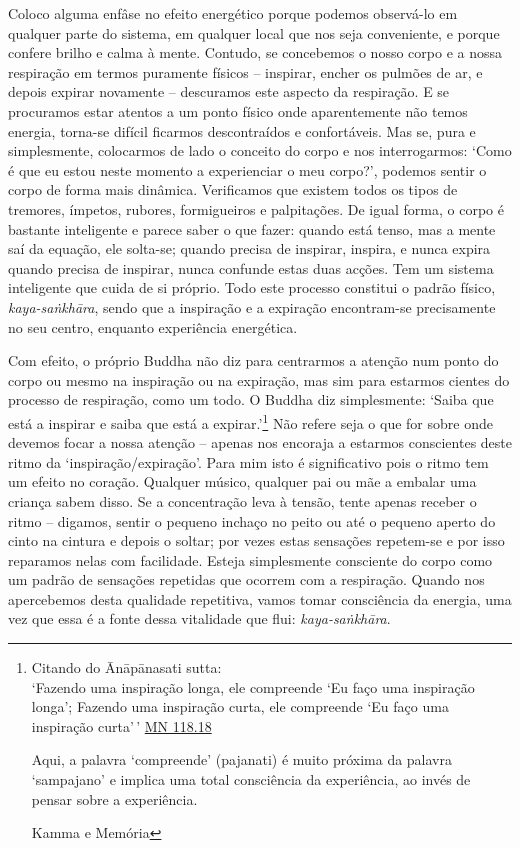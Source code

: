 Coloco alguma enfâse no efeito energético porque podemos observá-lo em qualquer parte do sistema, em qualquer local que nos seja conveniente, e porque confere brilho e calma à mente. Contudo, se concebemos o nosso corpo e a nossa respiração em termos puramente físicos -- inspirar, encher os pulmões de ar, e depois expirar novamente -- descuramos este aspecto da respiração. E se procuramos estar atentos a um ponto físico onde aparentemente não temos energia, torna-se difícil ficarmos descontraídos e confortáveis. Mas se, pura e simplesmente, colocarmos de lado o conceito do corpo e nos interrogarmos: `Como é que eu estou neste momento a experienciar o meu corpo?', podemos sentir o corpo de forma mais dinâmica. Verificamos que existem todos os tipos de tremores, ímpetos, rubores, formigueiros e palpitações. De igual forma, o corpo é bastante inteligente e parece saber o que fazer: quando está tenso, mas a mente saí da equação, ele solta-se; quando precisa de inspirar, inspira, e nunca expira quando precisa de inspirar, nunca confunde estas duas acções. Tem um sistema inteligente que cuida de si próprio. Todo este processo constitui o padrão físico, \emph{kaya-saṅkhāra}, sendo que a inspiração e a expiração encontram-se precisamente no seu centro, enquanto experiência energética.

Com efeito, o próprio Buddha não diz para centrarmos a atenção num ponto do corpo ou mesmo na inspiração ou na expiração, mas sim para estarmos cientes do processo de respiração, como um todo. O Buddha diz simplesmente: `Saiba que está a inspirar e saiba que está a expirar.'\footnote{Citando do Ānāpānasati sutta:\\
  `Fazendo uma inspiração longa, ele compreende `Eu faço uma inspiração longa'; Fazendo uma inspiração curta, ele compreende `Eu faço uma inspiração curta'\,' \href{https://suttacentral.net/mn118/en/bodhi}{MN 118.18}

  Aqui, a palavra `compreende' (pajanati) é muito próxima da palavra `sampajano' e implica uma total consciência da experiência, ao invés de pensar sobre a experiência. \hl{}

  \hl{}

  Kamma e Memória} Não refere seja o que for sobre onde devemos focar a nossa atenção -- apenas nos encoraja a estarmos conscientes deste ritmo da `inspiração/expiração'. Para mim isto é significativo pois o ritmo tem um efeito no coração. Qualquer músico, qualquer pai ou mãe a embalar uma criança sabem disso. Se a concentração leva à tensão, tente apenas receber o ritmo -- digamos, sentir o pequeno inchaço no peito ou até o pequeno aperto do cinto na cintura e depois o soltar; por vezes estas sensações repetem-se e por isso reparamos nelas com facilidade. Esteja simplesmente consciente do corpo como um padrão de sensações repetidas que ocorrem com a respiração. Quando nos apercebemos desta qualidade repetitiva, vamos tomar consciência da energia, uma vez que essa é a fonte dessa vitalidade que flui: \emph{kaya-saṅkhāra}.

